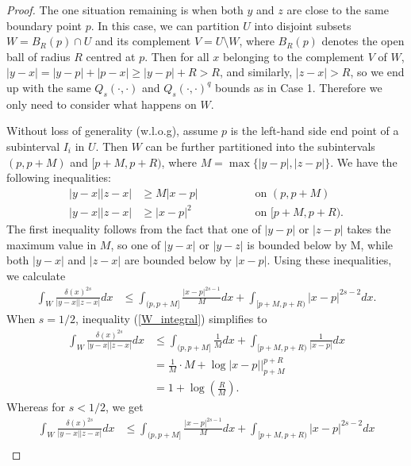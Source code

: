 \documentclass[preprint,12pt]{elsarticle}
\begin{document}
\begin{proof}
    The one situation remaining is when both $y$ and $z$ are close to the same boundary point $p$. In this case, we can partition $U$ into disjoint subsets $W=B_{R}(p)\cap U$ and its complement $V=U\setminus W$, where $B_R(p)$ denotes the open ball of radius $R$ centred at $p$. 
    Then for all $x$ belonging to the complement $V$ of $W$, $|y-x|=|y-p|+|p-x|\geq |y-p|+R> R$, and similarly, $|z-x|>R$, so we end up with the same $Q_s(\cdot,\cdot)$ and $Q_s(\cdot,\cdot)^q$ bounds as in Case 1. Therefore we only need to consider what happens on $W$.

    Without loss of generality (w.l.o.g), assume $p$ is the left-hand side end point of a subinterval $I_i$ in $U$. Then $W$ can be further partitioned into the subintervals $(p,p+M)$ and $[p+M,p+R)$, where $M=\max\{|y-p|,|z-p|\}$. We have the following inequalities:
    \begin{align*}
        |y-x||z-x|&\geq M|x-p| \qquad\qquad&\mbox{ on }(p,p+M)\\
        |y-x||z-x|&\geq |x-p|^2 \qquad\qquad&\mbox{ on }[p+M,p+R).
    \end{align*}
    The first inequality follows from the fact that one of $|y-p|$ or $|z-p|$ takes the maximum value in $M$, so one of $|y-x|$ or $|y-z|$ is bounded below by M, while both $|y-x|$ and $|z-x|$ are bounded below by $|x-p|$. Using these inequalities, we calculate
    \begin{align}\label{W_integral}
        \int_W\frac{\delta(x)^{2s}}{|y-x||z-x|}dx&\leq\int_{(p,p+M]}\frac{|x-p|^{2s-1}}{M}dx+\int_{[p+M,p+R)}|x-p|^{2s-2}dx.
    \end{align}
    When $s=1/2$, inequality (\ref{W_integral}) simplifies to
    \begin{align}\label{s=1/2_W_integral}
        \int_W\frac{\delta(x)^{2s}}{|y-x||z-x|}dx&\leq\int_{(p,p+M]}\frac{1}{M}dx+\int_{[p+M,p+R)}\frac{1}{|x-p|}dx\nonumber\\
        &=\frac{1}{M}\cdot M+\log|x-p|\Big|_{p+M}^{p+R}\nonumber\\
        &=1 + \log\left(\frac{R}{M}\right).
    \end{align}
    Whereas for $s<1/2$, we get
    \begin{align}\label{s<1/2_W_integral}
        \int_W\frac{\delta(x)^{2s}}{|y-x||z-x|}dx&\leq\int_{(p,p+M]}\frac{|x-p|^{2s-1}}{M}dx+\int_{[p+M,p+R)}|x-p|^{2s-2}dx \nonumber\\

\end{align}
\end{proof}
\end{document}
